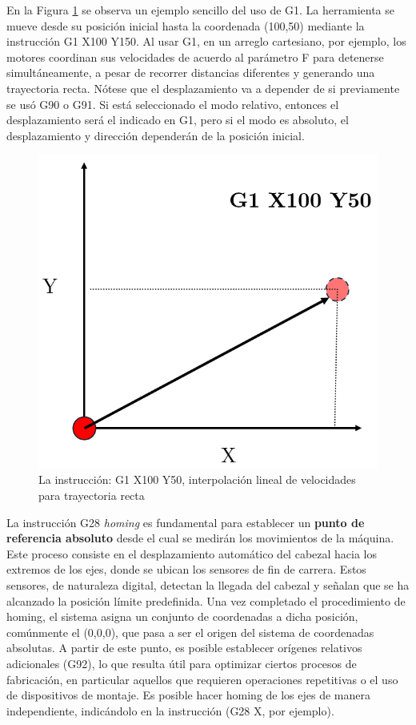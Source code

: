 En la Figura \ref{g1} se observa un ejemplo sencillo del uso de G1. La herramienta se mueve desde su posición inicial hasta la coordenada (100,50) mediante la instrucción G1 X100 Y150. Al usar G1, en un arreglo cartesiano, por ejemplo, los motores coordinan sus velocidades de acuerdo al parámetro F para detenerse simultáneamente, a pesar de recorrer distancias diferentes y generando una trayectoria recta. Nótese que el desplazamiento va a depender de si previamente se usó G90 o G91. Si está seleccionado el modo relativo, entonces el desplazamiento será el indicado en G1, pero si el modo es absoluto, el desplazamiento y dirección dependerán de la posición inicial.


\begin{figure}[h!]
    \centering
    \includegraphics[width=0.5\linewidth]{imgs/g1.png}
    \caption{La instrucción: G1 X100 Y50, interpolación lineal de velocidades para trayectoria recta}
    \label{g1}
\end{figure}


La instrucción G28 \textit{homing} es fundamental para establecer un \textbf{punto de referencia absoluto} desde el cual se medirán los movimientos de la máquina. Este proceso consiste en el desplazamiento automático del cabezal hacia los extremos de los ejes, donde se ubican los sensores de fin de carrera. Estos sensores, de naturaleza digital, detectan la llegada del cabezal y señalan que se ha alcanzado la posición límite predefinida. Una vez completado el procedimiento de homing, el sistema asigna un conjunto de coordenadas a dicha posición, comúnmente el (0,0,0), que pasa a ser el origen del sistema de coordenadas absolutas. A partir de este punto, es posible establecer orígenes relativos adicionales (G92), lo que resulta útil para optimizar ciertos procesos de fabricación, en particular aquellos que requieren operaciones repetitivas o el uso de dispositivos de montaje. Es posible hacer homing de los ejes de manera independiente, indicándolo en la instrucción (G28 X, por ejemplo).


